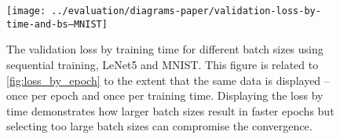 \documentclass[conference,compsoc,a4paper]{IEEEtran}
\begin{document}





\begin{figure}[!t]
\centering
\texttt{[image: ../evaluation/diagrams-paper/validation-loss-by-time-and-bs--MNIST]}
\caption{The validation loss by training time for different batch sizes using sequential training, LeNet5 and MNIST.
This figure is related to \autoref{fig:loss_by_epoch} to the extent that the same data is displayed -- once per epoch and once per training time.
Displaying the loss by time demonstrates how larger batch sizes result in faster epochs but selecting too large batch sizes can compromise the convergence.}
\label{fig:loss_by_time}
\end{figure}
\end{document}
